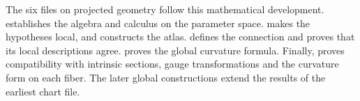 The six files on projected geometry follow this mathematical development.  establishes the algebra and calculus on the parameter space.  makes the hypotheses local, and  constructs the atlas.  defines the connection and proves that its local descriptions agree.  proves the global curvature formula. Finally,  proves compatibility with intrinsic sections, gauge transformations and the curvature form on each fiber. The later global constructions extend the results of the earliest chart file.
